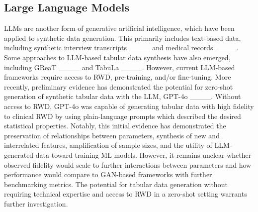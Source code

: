 \subsection{Large Language Models}
LLMs are another form of generative artificial intelligence, which have been applied to synthetic data generation. This primarily includes text-based data, including synthetic interview transcripts ____ and medical records ____. Some approaches to LLM-based tabular data synthesis have also emerged, including GReaT ____ and TabuLa ____. However, current LLM-based frameworks require access to RWD, pre-training, and/or fine-tuning. More recently, preliminary evidence has demonstrated the potential for zero-shot generation of synthetic tabular data with the LLM, GPT-4o ____. Without access to RWD, GPT-4o was capable of generating tabular data with high fidelity to clinical RWD by using plain-language prompts which described the desired statistical properties. Notably, this initial evidence has demonstrated the preservation of relationships between parameters, synthesis of new and interrelated features, amplification of sample sizes, and the utility of LLM-generated data toward training ML models. However, it remains unclear whether observed fidelity would scale to further interactions between parameters and how performance would compare to GAN-based frameworks with further benchmarking metrics. The potential for tabular data generation without requiring technical expertise and access to RWD in a zero-shot setting warrants further investigation.